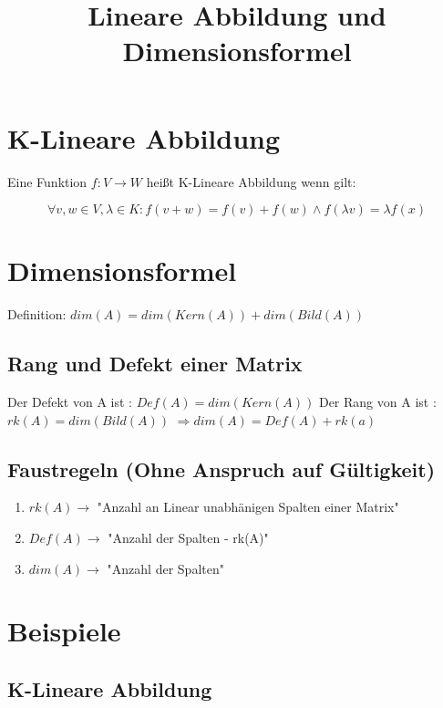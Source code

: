 \documentclass[12pt]{article}
\begin{document}
    \title{Lineare Abbildung und Dimensionsformel}
    \maketitle
    \section{K-Lineare Abbildung}
    Eine Funktion  $f:V\rightarrow W$ \nolinebreak heißt K-Lineare Abbildung wenn gilt:

    \[\forall v,w\in V, \lambda \in K : f(v+w) = f(v) + f(w) \wedge f(\lambda v) = \lambda f(x)\]

    \section{Dimensionsformel}
    Definition: $dim(A)=dim(Kern(A))+dim(Bild(A))$

    \subsection{Rang und Defekt einer Matrix}

    Der Defekt von A ist : $Def(A) = dim(Kern(A))$ \newline
    \newline
    Der Rang von A ist : $rk(A)=dim(Bild(A))$ \newline
    \newline
    $\Rightarrow dim(A)=Def(A)+rk(a)$


    \subsection{Faustregeln (Ohne Anspruch auf Gültigkeit)}

    \begin{enumerate}
        \item $rk(A)\rightarrow$ "Anzahl an Linear unabhänigen Spalten einer Matrix"
        \item $Def(A) \rightarrow$ "Anzahl der Spalten - rk(A)"
        \item $dim(A) \rightarrow $ "Anzahl der Spalten"
    \end{enumerate}

    \newpage
    \section{Beispiele}

    \subsection{K-Lineare Abbildung}
\end{document}
